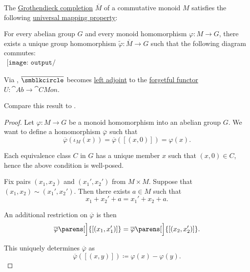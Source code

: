 \begin{proposition}\label{thm:monoid_grothendieck_completion_universal_property}
  The \hyperref[def:monoid_grothendieck_completion]{Grothendieck completion} \( \overline{M} \) of a commutative monoid \( M \) satisfies the following \hyperref[rem:universal_mapping_property]{universal mapping property}:
  \begin{displayquote}
    For every abelian group \( G \) and every monoid homomorphism \( \varphi: M \to G \), there exists a unique group homomorphism \( \widetilde{\varphi}: \overline{M} \to G \) such that the following diagram commutes:
    \begin{equation}\label{eq:thm:monoid_grothendieck_completion_universal_property/diagram}
      \begin{aligned}
        \texttt{[image: output/thm\_\_monoid\_grothendieck\_completion\_universal\_propety.pdf]}
      \end{aligned}
    \end{equation}
  \end{displayquote}

  Via , \( \overline{\anon} \) becomes \hyperref[def:category_adjunction]{left adjoint} to the \hyperref[def:concrete_category]{forgetful functor} \( U: \cat{Ab} \to \cat{CMon} \).

  Compare this result to .
\end{proposition}
\begin{proof}
  Let \( \varphi: M \to G \) be a monoid homomorphism into an abelian group \( G \). We want to define a homomorphism \( \overline{\varphi} \) such that
  \begin{equation*}
    \overline{\varphi}(\iota_M(x)) = \overline{\varphi}([(x, 0)]) = \varphi(x).
  \end{equation*}

  Each equivalence class \( C \) in \( G \) has a unique member \( x \) such that \( (x, 0) \in C \), hence the above condition is well-posed.

  Fix pairs \( (x_1, x_2) \) and \( (x_1', x_2') \) from \( M \times M \). Suppose that \( (x_1, x_2) \sim (x_1', x_2') \). Then there exists \( a \in M \) such that
  \begin{equation*}
    x_1 + x_2' + a = x_1' + x_2 + a.
  \end{equation*}

  An additional restriction on \( \overline{\varphi} \) is then
  \begin{equation*}
    \overline{\varphi}\parens[\Big]{ [(x_1, x_1')] }
    =
    \overline{\varphi}\parens[\Big]{ [(x_2, x_2')] }.
  \end{equation*}

  This uniquely determines \( \overline{\varphi} \) as
  \begin{equation*}
    \overline{\varphi}([(x, y)]) \coloneqq \varphi(x) - \varphi(y).
  \end{equation*}
\end{proof}


